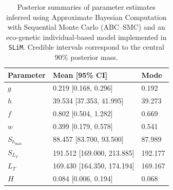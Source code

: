 \begin{table}[!h]
\centering
\caption{\label{tab:tab:S2_ABC_parameters}Posterior summaries of parameter estimates inferred using Approximate Bayesian Computation with Sequential Monte Carlo (ABC--SMC) and an eco-genetic individual-based model implemented in \texttt{SLiM}. Credible intervals correspond to the central 90\% posterior mass.}
\centering
\begin{tabular}[t]{lll}
\toprule
Parameter & Mean [95\% CI] & Mode\\
\midrule
$g$ & 0.219 [0.168, 0.296] & 0.192\\
$h$ & 39.534 [37.353, 41.995] & 39.273\\
$f$ & 0.802 [0.504, 1.282] & 0.669\\
$w$ & 0.399 [0.179, 0.578] & 0.541\\
$S_{h_{\max}}$ & 88.457 [83.700, 93.500] & 87.989\\
\addlinespace
$S_{L_T}$ & 191.512 [169.000, 213.885] & 192.177\\
$L_T$ & 169.430 [164.350, 174.194] & 169.167\\
$H$ & 0.084 [0.006, 0.194] & 0.068\\
\bottomrule
\end{tabular}
\end{table}
